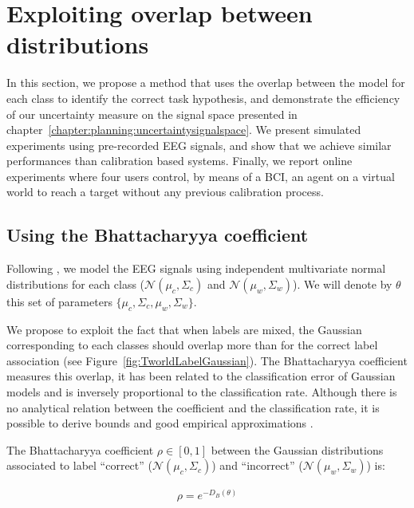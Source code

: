 
\section{Exploiting overlap between distributions}
\label{chapter:limitations:overlap}


In this section, we propose a method that uses the overlap between the model for each class to identify the correct task hypothesis, and demonstrate the efficiency of our uncertainty measure on the signal space presented in chapter~\ref{chapter:planning:uncertaintysignalspace}. We present simulated experiments using pre-recorded EEG signals, and show that we achieve similar performances than calibration based systems. Finally, we report online experiments where four users control, by means of a BCI, an agent on a virtual world to reach a target without any previous calibration process.

\subsection{Using the Bhattacharyya coefficient}

Following \cite{blankertz2010single}, we model the EEG signals using independent multivariate normal distributions for each class ($\mathcal{N}(\mu_c, \Sigma_c)$ and $\mathcal{N}(\mu_w, \Sigma_w)$). We will denote by $\theta$ this set of parameters $\{\mu_c, \Sigma_c,\mu_w, \Sigma_w\}$.

We propose to exploit the fact that when labels are mixed, the Gaussian corresponding to each classes should overlap more than for the correct label association (see Figure~\ref{fig:TworldLabelGaussian}). The Bhattacharyya coefficient measures this overlap, it has been related to the classification error of Gaussian models \cite{Kailath67} and is inversely proportional to the classification rate. Although there is no analytical relation between the coefficient and the classification rate, it is possible to derive bounds and good empirical approximations \cite{lee2000bayes}.

The Bhattacharyya coefficient $\rho \in [0,1]$ between the Gaussian distributions associated to label ``correct'' ($\mathcal{N}(\mu_c, \Sigma_c)$) and ``incorrect'' ($\mathcal{N}(\mu_w, \Sigma_w)$) is:

\begin{eqnarray}
\rho = e^{-D_B(\theta)}
\end{eqnarray}

